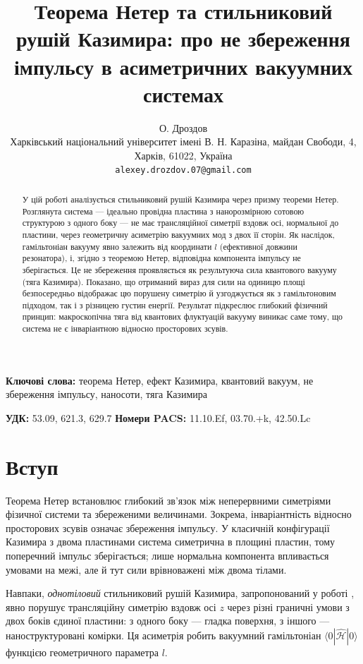 \documentclass[10pt]{article}
\title{Теорема Нетер та стильниковий рушій Казимира: про не збереження імпульсу в асиметричних вакуумних системах}
\author{О. Дроздов\\
Харківський національний університет імені В. Н. Каразіна, майдан Свободи, 4, Харків, 61022, Україна\\
\texttt{alexey.drozdov.07@gmail.com}}
\date{}
\begin{document}
\maketitle

\begin{abstract}
У цій роботі аналізується стильниковий рушій Казимира через призму теореми Нетер. Розглянута система — ідеально провідна пластина з нанорозмірною сотовою структурою з одного боку — не має трансляційної симетрії вздовж осі, нормальної до пластини, через геометричну асиметрію вакуумних мод з двох її сторін. Як наслідок, гамільтоніан вакууму явно залежить від координати $l$ (ефективної довжини резонатора), і, згідно з теоремою Нетер, відповідна компонента імпульсу не зберігається. Це не збереження проявляється як результуюча сила квантового вакууму (тяга Казимира). Показано, що отриманий вираз для сили на одиницю площі безпосередньо відображає цю порушену симетрію й узгоджується як з гамільтоновим підходом, так і з різницею густин енергії. Результат підкреслює глибокий фізичний принцип: макроскопічна тяга від квантових флуктуацій вакууму виникає саме тому, що система не є інваріантною відносно просторових зсувів.
\end{abstract}

\medskip
\noindent\textbf{Ключові слова:} теорема Нетер, ефект Казимира, квантовий вакуум, не збереження імпульсу, наносоти, тяга Казимира

\medskip
\noindent\textbf{УДК:} 53.09, 621.3, 629.7 \quad
\textbf{Номери PACS:} 11.10.Ef, 03.70.+k, 42.50.Lc

\section{Вступ}
Теорема Нетер встановлює глибокий зв’язок між неперервними симетріями фізичної системи та збереженими величинами. Зокрема, інваріантність відносно просторових зсувів означає збереження імпульсу. У класичній конфігурації Казимира з двома пластинами система симетрична в площині пластин, тому поперечний імпульс зберігається; лише нормальна компонента впливається умовами на межі, але й тут сили врівноважені між двома тілами.

Навпаки, \textit{однотіловий} стильниковий рушій Казимира, запропонований у роботі \cite{Drozdov2024}, явно порушує трансляційну симетрію вздовж осі $z$ через різні граничні умови з двох боків єдиної пластини: з одного боку — гладка поверхня, з іншого — наноструктуровані комірки. Ця асиметрія робить вакуумний гамільтоніан $\langle 0|\hat{\mathcal{H}}|0\rangle$ функцією геометричного параметра $l$.
\end{document}
